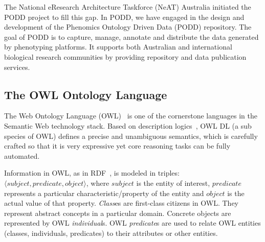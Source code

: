 \documentclass{llncs}
\begin{document}
The National eResearch Architecture Taskforce (NeAT) Australia
initiated the PODD project to fill this gap. In PODD, we have
engaged in the design and development of the Phenomics Ontology
Driven Data (PODD) repository. The goal of PODD is to capture,
manage, annotate and distribute the data generated by phenotyping
platforms. It supports both Australian and international biological
research communities by providing repository and data publication
services.

\subsection{The OWL Ontology Language}
The Web Ontology Language (OWL)~\cite{hoph03a} is one of the
cornerstone languages in the Semantic Web technology stack. Based on
description logics~\cite{DBLP:conf/dlog/McGuinness03}, OWL DL (a sub
species of OWL) defines a precise and unambiguous semantics, which
is carefully crafted so that it is very expressive yet core
reasoning tasks can be fully automated.

Information in OWL, as in RDF~\cite{rdfprimer04}, is modeled in
triples: $\langle subject, predicate,\allowbreak object\rangle$,
where $subject$ is the entity of interest, $predicate$ represents a
particular characteristic/property of the entity and $object$ is the
actual value of that property. \emph{Class}es are first-class
citizens in OWL. They represent abstract concepts in a particular
domain. Concrete objects are represented by OWL \emph{individual}s.
OWL \emph{predicate}s are used to relate OWL entities (classes,
individuals, predicates) to their attributes or other entities.
\end{document}
